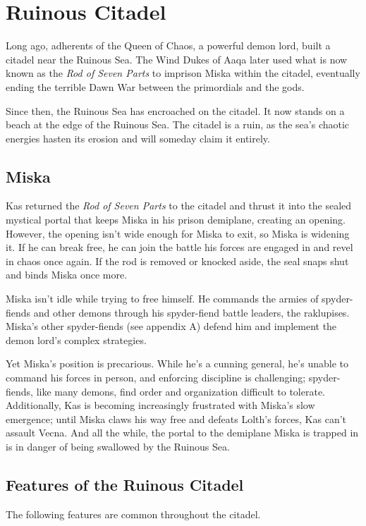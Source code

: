 \documentclass[10pt,a4paper,twoside,bg=print,twocolumn,openany,nodeprecatedcode]{dndbook}
\begin{document}
\section{Ruinous Citadel}
Long ago, adherents of the Queen of Chaos, a powerful demon lord, built a citadel near the Ruinous Sea. The Wind Dukes of Aaqa later used what is now known as the \textit{Rod of Seven Parts} to imprison Miska within the citadel, eventually ending the terrible Dawn War between the primordials and the gods.

Since then, the Ruinous Sea has encroached on the citadel. It now stands on a beach at the edge of the Ruinous Sea. The citadel is a ruin, as the sea's chaotic energies hasten its erosion and will someday claim it entirely.

\subsection{Miska}
Kas returned the \textit{Rod of Seven Parts} to the citadel and thrust it into the sealed mystical portal that keeps Miska in his prison demiplane, creating an opening. However, the opening isn't wide enough for Miska to exit, so Miska is widening it. If he can break free, he can join the battle his forces are engaged in and revel in chaos once again. If the rod is removed or knocked aside, the seal snaps shut and binds Miska once more.

Miska isn't idle while trying to free himself. He commands the armies of spyder-fiends and other demons through his spyder-fiend battle leaders, the raklupises. Miska's other spyder-fiends (see appendix A) defend him and implement the demon lord's complex strategies.

Yet Miska's position is precarious. While he's a cunning general, he's unable to command his forces in person, and enforcing discipline is challenging; spyder-fiends, like many demons, find order and organization difficult to tolerate. Additionally, Kas is becoming increasingly frustrated with Miska's slow emergence; until Miska claws his way free and defeats Lolth's forces, Kas can't assault Vecna. And all the while, the portal to the demiplane Miska is trapped in is in danger of being swallowed by the Ruinous Sea.

\subsection{Features of the Ruinous Citadel}
The following features are common throughout the citadel.
\end{document}
